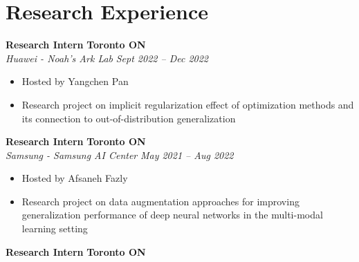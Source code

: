 \section*{Research Experience}
    \vspace{\postsubhead}
      \vspace{\interlist}
      \textbf{Research Intern}
      \hfill
      \textbf{Toronto ON}\\
      \textit{Huawei - Noah's Ark Lab}
      \hfill
      \textit{Sept 2022 -- Dec 2022}
      \begin{itemize}
        \setlength\itemsep{0.2em}
        \item Hosted by Yangchen Pan
        \item Research project on implicit regularization effect of optimization methods and its connection to out-of-distribution generalization
      \end{itemize}
      \textbf{Research Intern}
      \hfill
      \textbf{Toronto ON}\\
      \textit{Samsung - Samsung AI Center}
      \hfill
      \textit{May 2021 -- Aug 2022}
      \begin{itemize}
        \setlength\itemsep{0.2em}
        \item Hosted by Afsaneh Fazly
        \item Research project on data augmentation approaches for improving generalization performance of deep neural networks in the multi-modal learning setting
      \end{itemize}
      \vspace{\interlist}
      \textbf{Research Intern}
      \hfill
      \textbf{Toronto ON}\\
